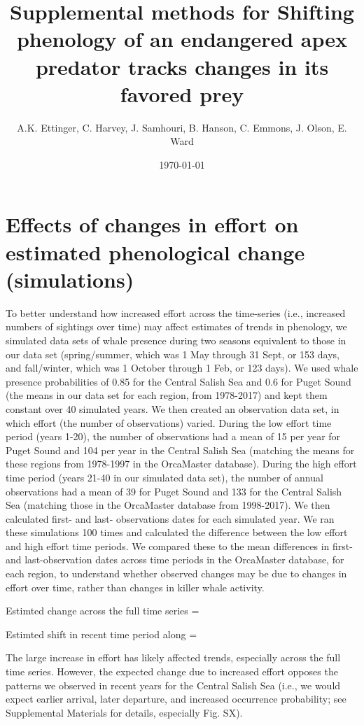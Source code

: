 \documentclass{article}
\begin{document}



\title{Supplemental methods for Shifting phenology of an endangered apex predator tracks changes in its favored prey}
\date{\today}
\maketitle
\author{A.K. Ettinger, C. Harvey, J. Samhouri, B. Hanson, C. Emmons, J. Olson, E. Ward}

\section* {Effects of changes in effort on estimated phenological change (simulations)}
To better understand how increased effort across the time-series (i.e., increased numbers of sightings over time) may affect estimates of trends in phenology, we simulated data sets of whale presence during two seasons equivalent to those in our data set (spring/summer, which was 1 May through 31 Sept, or 153 days, and fall/winter, which was 1 October through 1 Feb, or 123 days). We used whale presence probabilities of 0.85 for the Central Salish Sea and 0.6 for Puget Sound (the means in our data set for each region, from 1978-2017) and kept them constant over 40 simulated years. We then created an observation data set, in which effort (the number of observations) varied. During the low effort time period (years 1-20), the number of observations had a mean of 15 per year for Puget Sound and 104 per year in the Central Salish Sea (matching the means for these regions from 1978-1997 in the OrcaMaster database). During the high effort time period (years 21-40 in our simulated data set), the number of annual observations had a mean of 39 for Puget Sound and 133 for the Central Salish Sea (matching those in the OrcaMaster database from 1998-2017). We then calculated first- and last- observations dates for each simulated year. We ran these simulations 100 times and calculated the difference between the low effort and high effort time periods. We compared these to the mean differences in first- and last-observation dates across time periods in the OrcaMaster database, for each region, to understand whether observed changes may be due to changes in effort over time, rather than changes in killer whale activity. 

\par Estimted change across the full time series = 
\par Estimted shift in recent time period along = 
\par The large increase in effort has likely affected trends, especially across the full time series.  However, the expected change due to increased effort opposes the patterns we observed in recent years for the Central Salish Sea (i.e., we would expect earlier arrival, later departure, and increased occurrence probability;  see Supplemental Materials for details, especially Fig. SX). 
\end{document}
